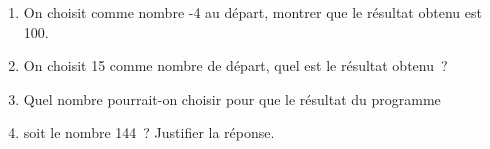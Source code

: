 \documentclass[exercice]{thedocument}%
\begin{document}
%
{\centering
\begin{mdframed}
    
\end{mdframed}
}
\begin{enumerate}
    \item On choisit comme nombre -4 au départ, montrer que le résultat obtenu
    est 100.
    \item  On choisit 15 comme nombre de départ, quel est le résultat obtenu~?
    \item Quel nombre pourrait-on choisir pour que le résultat du programme
    \item soit le nombre 144~? Justifier la réponse.
\end{enumerate}
\end{document}
